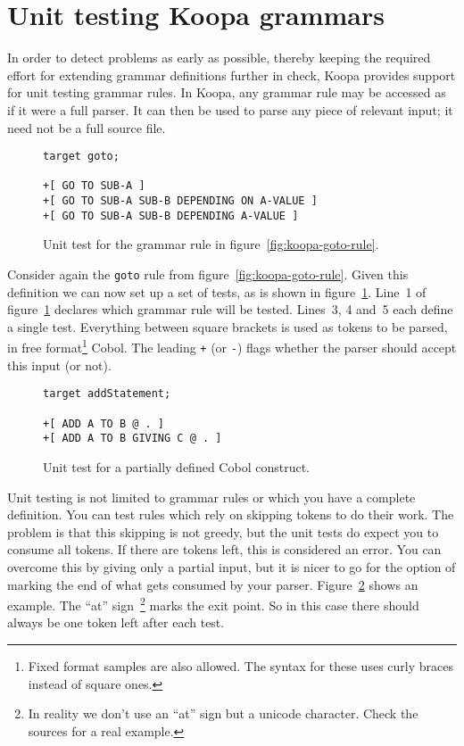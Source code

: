 \documentclass[a4paper]{article}
\begin{document}

\section{Unit testing Koopa grammars}
\label{testing}

In order to detect problems as early as possible, thereby keeping the required effort for extending grammar definitions further in check, Koopa provides support for unit testing grammar rules. In Koopa, any grammar rule may be accessed as if it were a full parser. It can then be used to parse any piece of relevant input; it need not be a full source file.

\begin{figure}
\centering
\begin{lstlisting}
target goto;

+[ GO TO SUB-A ]
+[ GO TO SUB-A SUB-B DEPENDING ON A-VALUE ]
+[ GO TO SUB-A SUB-B DEPENDING A-VALUE ]
\end{lstlisting}
\caption{Unit test for the grammar rule in figure~\ref{fig:koopa-goto-rule}.}
\label{fig:koopa-goto-test}
\end{figure}

Consider again the \lstinline|goto| rule from figure~\ref{fig:koopa-goto-rule}. Given this definition we can now set up a set of tests, as is shown in figure~\ref{fig:koopa-goto-test}. Line~1 of figure~\ref{fig:koopa-goto-test} declares which grammar rule will be tested. Lines~3, 4 and~5 each define a single test. Everything between square brackets is used as tokens to be parsed, in free format\footnote{\scriptsize Fixed format samples are also allowed. The syntax for these uses curly braces instead of square ones.} Cobol. The leading \lstinline|+| (or \lstinline|-|) flags whether the parser should accept this input (or not).

\begin{figure}
\centering
\begin{lstlisting}
target addStatement;

+[ ADD A TO B @ . ]
+[ ADD A TO B GIVING C @ . ]
\end{lstlisting}
\caption{Unit test for a partially defined Cobol construct.}
\label{fig:koopa-test-with-marker}
\end{figure}

Unit testing is not limited to grammar rules or which you have a complete definition. You can test rules which rely on skipping tokens to do their work. The problem is that this skipping is not greedy, but the unit tests do expect you to consume all tokens. If there are tokens left, this is considered an error. You can overcome this by giving only a partial input, but it is nicer to go for the option of marking the end of what gets consumed by your parser. Figure~\ref{fig:koopa-test-with-marker} shows an example. The ``at'' sign~\footnote{\scriptsize In reality we don't use an ``at'' sign but a unicode character. Check the sources for a real example.} marks the exit point. So in this case there should always be one token left after each test.
\end{document}

